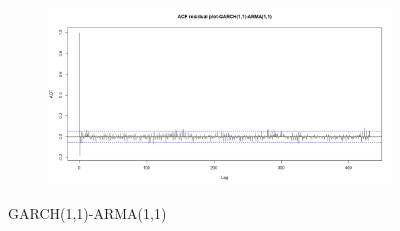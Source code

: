 \documentclass[12pt]{article}
\begin{document}
\begin{figure}[H]
\begin{subfigure}[b]{0.49\linewidth}
  \end{subfigure}
  \begin{subfigure}[b]{0.49\linewidth}
    \includegraphics[width=\linewidth]{figure27-4.png}
  \end{subfigure}
  \caption{GARCH(1,1)-ARMA(1,1)}
  \label{fig:figure28}
\end{figure}
\end{document}
